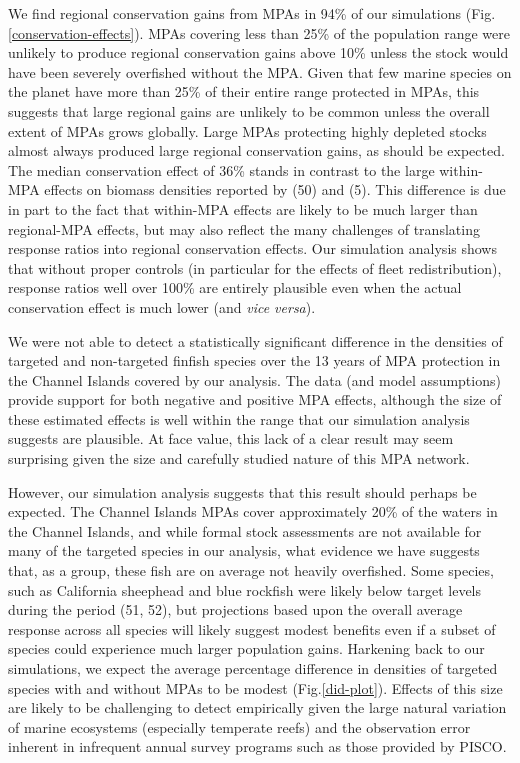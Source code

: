 \documentclass[9pt,twocolumn,twoside,lineno]{pnas-new}
\begin{document}
We find regional conservation gains from MPAs in 94\% of our simulations
(Fig.\ref{conservation-effects}). MPAs covering less than 25\% of the
population range were unlikely to produce regional conservation gains
above 10\% unless the stock would have been severely overfished without
the MPA. Given that few marine species on the planet have more than 25\%
of their entire range protected in MPAs, this suggests that large
regional gains are unlikely to be common unless the overall extent of
MPAs grows globally. Large MPAs protecting highly depleted stocks almost
always produced large regional conservation gains, as should be
expected. The median conservation effect of 36\% stands in contrast to
the large within-MPA effects on biomass densities reported by (50) and
(5). This difference is due in part to the fact that within-MPA effects
are likely to be much larger than regional-MPA effects, but may also
reflect the many challenges of translating response ratios into regional
conservation effects. Our simulation analysis shows that without proper
controls (in particular for the effects of fleet redistribution),
response ratios well over 100\% are entirely plausible even when the
actual conservation effect is much lower (and \emph{vice versa}).

We were not able to detect a statistically significant difference in the
densities of targeted and non-targeted finfish species over the 13 years
of MPA protection in the Channel Islands covered by our analysis. The
data (and model assumptions) provide support for both negative and
positive MPA effects, although the size of these estimated effects is
well within the range that our simulation analysis suggests are
plausible. At face value, this lack of a clear result may seem
surprising given the size and carefully studied nature of this MPA
network.

However, our simulation analysis suggests that this result should
perhaps be expected. The Channel Islands MPAs cover approximately 20\%
of the waters in the Channel Islands, and while formal stock assessments
are not available for many of the targeted species in our analysis, what
evidence we have suggests that, as a group, these fish are on average
not heavily overfished. Some species, such as California sheephead and
blue rockfish were likely below target levels during the period (51,
52), but projections based upon the overall average response across all
species will likely suggest modest benefits even if a subset of species
could experience much larger population gains. Harkening back to our
simulations, we expect the average percentage difference in densities of
targeted species with and without MPAs to be modest
(Fig.\ref{did-plot}). Effects of this size are likely to be challenging
to detect empirically given the large natural variation of marine
ecosystems (especially temperate reefs) and the observation error
inherent in infrequent annual survey programs such as those provided by
PISCO.
\end{document}
